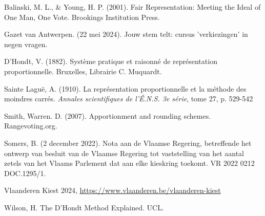  \begin{bronnen}
\item Balinski, M. L., & Young, H. P. (2001). Fair Representation: Meeting the Ideal of One Man, One Vote. Brookings Institution Press.
\item Gazet van Antwerpen. (22 mei 2024). Jouw stem telt: cursus 'verkiezingen' in negen vragen.
\item D'Hondt, V. (1882). Système pratique et raisonné de représentation proportionnelle. Bruxelles, Librairie C. Muquardt. 

\item Sainte Laguë, A. (1910). La représentation proportionnelle et la méthode des moindres carrés. \textit{Annales scientifiques de l’É.N.S. 3e
série}, tome 27, p. 529-542

\item Smith, Warren. D. (2007). Apportionment and rounding schemes. Rangevoting.org.

\item Somers, B. (2 december 2022). Nota aan de Vlaamse Regering, betreffende het ontwerp van besluit van de Vlaamse Regering tot vaststelling van het aantal zetels van het Vlaams Parlement dat aan elke kieskring toekomt. VR 2022 0212 DOC.1295/1.

\item Vlaanderen Kiest 2024, \url{https://www.vlaanderen.be/vlaanderen-kiest}
\item Wilson, H. The D'Hondt Method Explained. UCL.



 \end{bronnen}



